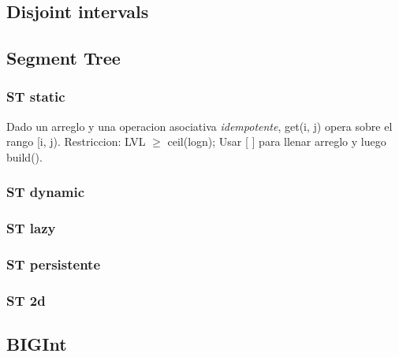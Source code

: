\subsection{Disjoint intervals}


\subsection{Segment Tree}
\subsubsection{ST static}
Dado un arreglo y una operacion asociativa \emph{idempotente}, get(i, j) opera sobre el rango [i, j). Restriccion: LVL $\ge$ ceil(logn); Usar [ ] para llenar arreglo y luego build().

\subsubsection{ST dynamic}

\subsubsection{ST lazy}

\subsubsection{ST persistente}

\subsubsection{ST 2d}



\subsection{BIGInt}

